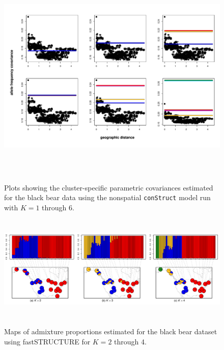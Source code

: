 \documentclass[12pt]{article}
\begin{document}
\begin{figure}
	\centering
		{\includegraphics[width=6in,height=4in]{figs/bears/bear_nsp_clst_covs.pdf}}
	\caption{
	Plots showing the cluster-specific parametric covariances 
	estimated for the black bear data using 
	the nonspatial \texttt{conStruct} model run with $K=1$ through 6.
    }\label{bear_nsp_clst_covs}
\end{figure}

\begin{figure}
	\centering
		{\includegraphics[width=6in,height=2in]{figs/bears/bear_fastStr_results.pdf}}
	\caption{
	Maps of admixture proportions estimated for the black bear dataset 
	using fastSTRUCTURE \citep{fastStructure} for $K=2$ through 4.
    }\label{bear_fastStr}
\end{figure}

\newpage
\clearpage


\newpage
\end{document}
